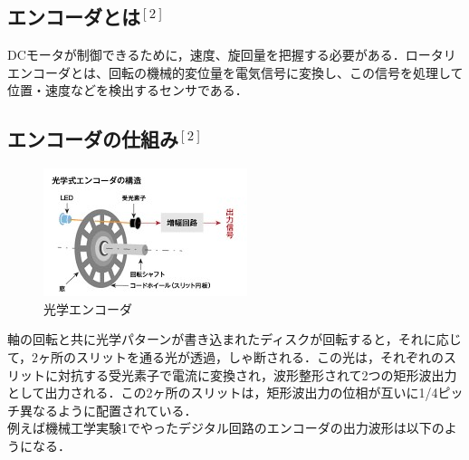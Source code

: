 \documentclass[xelatex,ja=standard,jafont=noto]{bxjsarticle}
\begin{document}
\subsection{エンコーダとは$ ^{[2]}　$}

DCモータが制御できるために，速度、旋回量を把握する必要がある．ロータリエンコーダとは、回転の機械的変位量を電気信号に変換し、この信号を処理して位置・速度などを検出するセンサである．\\

\subsection{エンコーダの仕組み$ ^{[2]}　$}

\begin{figure}[h!]
    \centering
    \includegraphics[scale=0.75]{014.jpg}
    \caption{光学エンコーダ }
\end{figure}

軸の回転と共に光学パターンが書き込まれたディスクが回転すると，それに応じて，2ヶ所のスリットを通る光が透過，しゃ断される．この光は，それぞれのスリットに対抗する受光素子で電流に変換され，波形整形されて2つの矩形波出力として出力される．この2ヶ所のスリットは，矩形波出力の位相が互いに1/4ピッチ異なるように配置されている．\\

例えば機械工学実験1でやったデジタル回路のエンコーダの出力波形は以下のようになる．

\newpage
\end{document}
